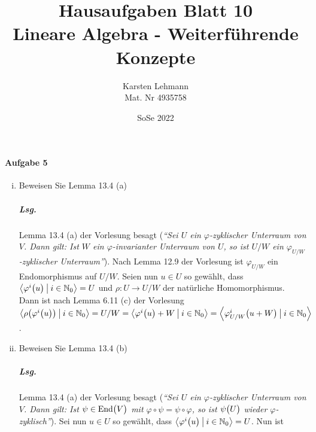 \documentclass{scrreprt}
\author{Karsten Lehmann\\Mat. Nr 4935758}
\date{SoSe 2022}
\title{Hausaufgaben Blatt 10\\Lineare Algebra - Weiterführende Konzepte}
\newcommand{\End}{\text{End}}
\begin{document}
\paragraph{Aufgabe 5}
\begin{enumerate}[(i)]
\item Beweisen Sie Lemma 13.4 (a)

  \subparagraph{Lsg.} Lemma 13.4 (a) der Vorlesung besagt (\emph{``Sei $U$ ein
    $\varphi$-zyklischer Unterraum von $V$.
    Dann gilt: Ist $W$ ein $\varphi$-invarianter Unterraum von $U$, so ist $U/W$
    ein $\varphi_{U/W}$-zyklischer Unterraum''}).
  Nach Lemma 12.9 der Vorlesung ist $\varphi_{U/W}$ ein Endomorphismus auf $U / W$.
  Seien nun $u \in U$ so gewählt, dass $\left\langle
    \varphi^i\qty\big(u) \:\big|\: i \in \mathbb{N}_0
  \right\rangle = U$ und $\rho \colon U \to U / W$ der natürliche Homomorphismus.
  Dann ist nach Lemma 6.11 (c) der Vorlesung $\left\langle
    \rho\qty\big(\varphi^i\qty\big(u)) \:\big|\: i \in \mathbb{N}_0
  \right\rangle = U / W = \left\langle
    \varphi^i\qty\big(u) + W \:\big|\: i \in \mathbb{N}_0
  \right\rangle = \left\langle
    \varphi_{U / W}^i\qty\big(u + W) \:\big|\: i \in \mathbb{N}_0
  \right\rangle$.

\item Beweisen Sie Lemma 13.4 (b)

  \subparagraph{Lsg.}  Lemma 13.4 (a) der Vorlesung besagt (\emph{``Sei $U$ ein
    $\varphi$-zyklischer Unterraum von $V$.
    Dann gilt: Ist $\psi \in \End\qty\big(V)$ mit
    $\varphi \circ \psi = \psi \circ \varphi$, so ist $\psi\qty\big(U)$ wieder
    $\varphi$-zyklisch''}).
  Sei nun $u \in U$ so gewählt, dass $\left\langle
    \varphi^i\qty\big(u) \:\big|\: i \in \mathbb{N}_0
  \right\rangle = U$.
  Nun ist
\end{enumerate}
\end{document}
